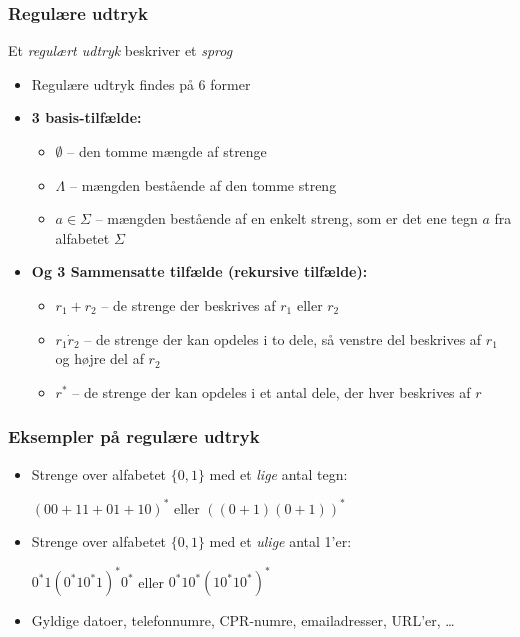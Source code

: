 \documentclass[]{beamer}
\begin{document}
\begin{frame}
\frametitle{Regulære udtryk}
Et \emph{regulært udtryk} beskriver et \emph{sprog}
\begin{itemize}
\item Regulære udtryk findes på 6 former
\item \textbf{3 basis-tilfælde:}
\begin{itemize}
\item $\emptyset$  	– den tomme mængde af strenge
\item $\Lambda$  	– mængden bestående af den tomme streng
\item $a\in\Sigma$	– mængden bestående af en enkelt streng, som
        	   er det ene tegn $a$ fra alfabetet $\Sigma$    
\end{itemize}
\item \textbf{Og 3 Sammensatte tilfælde (rekursive tilfælde):}
\begin{itemize}
\item $r_1+r_2$	– de strenge der beskrives af $r_1$ eller $r_2$
\item $r_1\dot r_2$	– de strenge der kan opdeles i to dele, så 
 	   venstre del beskrives af $r_1$ og højre del af $r_2$
\item $r^*$	– de strenge der kan opdeles i et antal dele,
		   der hver beskrives af $r$
    
\end{itemize}
\end{itemize}
\end{frame}

\begin{frame}
\frametitle{Eksempler på regulære udtryk}
\begin{itemize}[<+->]
\item Strenge over alfabetet $\{0,1\}$ med et \emph{lige} antal tegn:

$(00+11+01+10)^{*}$ eller $((0+1)(0+1))^{*}$
\item Strenge over alfabetet $\{0,1\}$ med et \emph{ulige} antal 1'er:

$0^{*}1(0^{*}10^{*}1)^{*}0^{*}$ eller $0^{*}10^{*}(10^{*}10^{*})^{*}$
\item Gyldige datoer, telefonnumre, CPR-numre, emailadresser, URL'er, \ldots
\end{itemize}
\end{frame}
\end{document}

